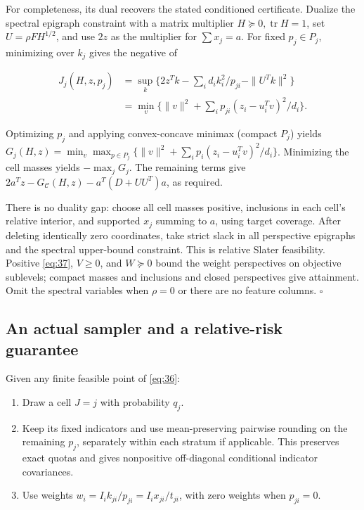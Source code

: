 \documentclass[11pt]{article}
\providecommand{\tightlist}{\setlength{\itemsep}{0pt}\setlength{\parskip}{0pt}}
\begin{document}
For completeness, its dual recovers the stated conditioned certificate.
Dualize the spectral epigraph constraint with a matrix multiplier
\(H\succeq0,\operatorname{tr}H=1\), set \(U=\rho FH^{1/2}\), and use
\(2z\) as the multiplier for \(\sum x_j=a\). For fixed \(p_j\in P_j\),
minimizing over \(k_j\) gives the negative of

\[
\begin{aligned}
J_j(H,z,p_j)
&=\sup_k\{2z^Tk-\sum_i d_i k_i^2/p_{ji}-\|U^Tk\|^2\}\\
&=\min_v\{\|v\|^2+\sum_i p_{ji}(z_i-u_i^Tv)^2/d_i\}.
\end{aligned}
\]

Optimizing \(p_j\) and applying convex-concave minimax (compact \(P_j\))
yields
\(G_j(H,z)=\min_v\max_{p\in P_j}\{\|v\|^2+\sum_i p_i(z_i-u_i^Tv)^2/d_i\}\).
Minimizing the cell masses yields \(-\max_jG_j\). The remaining terms
give \(2a^Tz-G_{\mathcal C}(H,z)-a^T(D+UU^T)a\), as required.

There is no duality gap: choose all cell masses positive, inclusions in
each cell's relative interior, and supported \(x_j\) summing to \(a\),
using target coverage. After deleting identically zero coordinates, take
strict slack in all perspective epigraphs and the spectral upper-bound
constraint. This is relative Slater feasibility. Positive \eqref{eq:37},
\(V\ge0\), and \(W\succeq0\) bound the weight perspectives on objective
sublevels; compact masses and inclusions and closed perspectives give
attainment. Omit the spectral variables when \(\rho=0\) or there are no
feature columns. \(\square\)

\subsection{An actual sampler and a relative-risk
guarantee}\label{an-actual-sampler-and-a-relative-risk-guarantee}

Given any finite feasible point of \eqref{eq:36}:

\begin{enumerate}
\def\labelenumi{\arabic{enumi}.}
\tightlist
\item
  Draw a cell \(J=j\) with probability \(q_j\).
\item
  Keep its fixed indicators and use mean-preserving pairwise rounding on
  the remaining \(p_j\), separately within each stratum if applicable.
  This preserves exact quotas and gives nonpositive off-diagonal
  conditional indicator covariances.
\item
  Use weights \(w_i=I_i k_{ji}/p_{ji}=I_i x_{ji}/t_{ji}\), with zero
  weights when \(p_{ji}=0\).
\end{enumerate}
\end{document}
